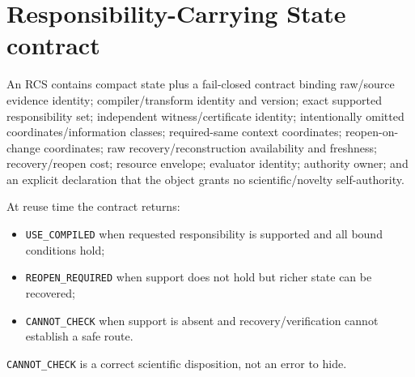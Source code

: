 \section{Responsibility-Carrying State
contract}\label{responsibility-carrying-state-contract}

An RCS contains compact state plus a fail-closed contract binding
raw/source evidence identity; compiler/transform identity and version;
exact supported responsibility set; independent witness/certificate
identity; intentionally omitted coordinates/information classes;
required-same context coordinates; reopen-on-change coordinates; raw
recovery/reconstruction availability and freshness; recovery/reopen
cost; resource envelope; evaluator identity; authority owner; and an
explicit declaration that the object grants no scientific/novelty
self-authority.

At reuse time the contract returns:

\begin{itemize}
\tightlist
\item
  \texttt{USE\_COMPILED} when requested responsibility is supported and
  all bound conditions hold;
\item
  \texttt{REOPEN\_REQUIRED} when support does not hold but richer state
  can be recovered;
\item
  \texttt{CANNOT\_CHECK} when support is absent and
  recovery/verification cannot establish a safe route.
\end{itemize}

\texttt{CANNOT\_CHECK} is a correct scientific disposition, not an error
to hide.
